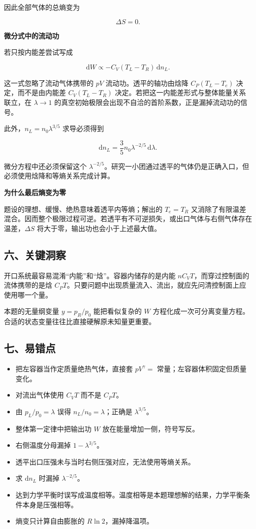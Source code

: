 \documentclass[12pt,a4paper,UTF8]{ctexart}
\newcommand{\tightlist}{\setlength{\itemsep}{0pt}\setlength{\parskip}{0pt}}
\begin{document}
因此全部气体的总熵变为

\[\boxed{\Delta S=0}.\]

\textbf{微分式中的流动功}

若只按内能差尝试写成

\[\mathrm{d}W\propto-C_V(T_L-T_R)\,\mathrm{d}n_L.\]

这一式忽略了流动气体携带的 \(pV\) 流动功。透平的轴功由焓降
\(C_P(T_L-T_e)\) 决定，而不是由内能差 \(C_V(T_L-T_R)\)
决定。若把这一内能差形式与整体能量关系联立，在 \(\lambda\to1\)
的真空初始极限会出现不自洽的首阶系数，正是漏掉流动功的信号。

此外，\(n_L=n_0\lambda^{3/5}\) 求导必须得到

\[\mathrm{d}n_L=\frac35n_0\lambda^{-2/5}\,\mathrm{d}\lambda.\]

微分方程中还必须保留这个
\(\lambda^{-2/5}\)。研究一小团通过透平的气体仍是正确入口，但必须使用焓降和等熵关系完成计算。

\textbf{为什么最后熵变为零}

题设的理想、缓慢、绝热意味着透平内等熵；解出的 \(T_e=T_R\)
又消除了有限温差混合。因而整个极限过程可逆。若透平有不可逆损失，或出口气体与右侧气体存在温差，\(\Delta S\)
将大于零，输出功也会小于上述最大值。

\subsection{六、关键洞察}\label{ux516dux5173ux952eux6d1eux5bdf-4}

开口系统最容易混淆``内能''和``焓''。容器内储存的是内能
\(nC_VT\)，而穿过控制面的流体携带的是焓
\(C_PT\)。只要问题中出现质量流入、流出，就应先问清控制面上应使用哪一个量。

本题的无量纲变量 \(y=p_R/p_0\) 能把看似复杂的 \(W\)
方程化成一次可分离变量方程。合适的状态变量往往比直接硬解原未知量更重要。

\subsection{七、易错点}\label{ux4e03ux6613ux9519ux70b9-4}

\begin{itemize}
\tightlist
\item
  把左容器当作定质量绝热气体，直接套 \(pV^\gamma=\)
  常量；左容器体积固定但质量变化。
\item
  对流出气体使用 \(C_VT\) 而不是 \(C_PT\)。
\item
  由 \(p_L/p_0=\lambda\) 误得 \(n_L/n_0=\lambda\)；正确是
  \(\lambda^{3/5}\)。
\item
  整体第一定律中把输出功 \(W\) 放在能量增加一侧，符号写反。
\item
  右侧温度分母漏掉 \(1-\lambda^{3/5}\)。
\item
  透平出口压强未与当时右侧压强对应，无法使用等熵关系。
\item
  求 \(\mathrm{d}n_L\) 时漏掉 \(\lambda^{-2/5}\)。
\item
  达到力学平衡时误写成温度相等。温度相等是本题理想解的结果，力学平衡条件本身是压强相等。
\item
  熵变只计算自由膨胀的 \(R\ln2\)，漏掉降温项。
\end{itemize}
\end{document}
